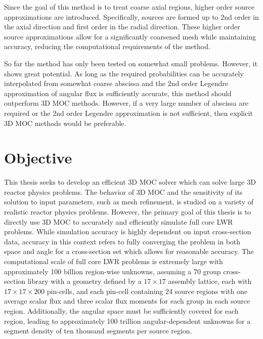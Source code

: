 Since the goal of this method is to treat coarse axial regions, higher order source approximations are introduced. Specifically, sources are formed up to 2nd order in the axial direction and first order in the radial direction. These higher order source approximations allow for a significantly coarsened mesh while maintaining accuracy, reducing the computational requirements of the method.

So far the method has only been tested on somewhat small problems. However, it shows great potential. As long as the required probabilities can be accurately interpolated from somewhat coarse abscissa and the 2nd order Legendre approximation of angular flux is sufficiently accurate, this method should outperform 3D \ac{MOC} methods. However, if a very large number of abscissa are required or the 2nd order Legendre approximation is not sufficient, then explicit 3D \ac{MOC} methods would be preferable. 


\section{Objective}

This thesis seeks to develop an efficient 3D \ac{MOC} solver which can solve large 3D reactor physics problems. The behavior of 3D \ac{MOC} and the sensitivity of its solution to input parameters, such as mesh refinement, is studied on a variety of realistic reactor physics problems. However, the primary goal of this thesis is to directly use 3D \ac{MOC} to accurately and efficiently simulate full core \ac{LWR} problems. While simulation accuracy is highly dependent on input cross-section data, accuracy in this context refers to fully converging the problem in both space and angle for a cross-section set which allows for reasonable accuracy. The computational scale of full core \ac{LWR} problems is extremely large with approximately 100 billion region-wise unknowns, assuming a 70 group cross-section library with a geometry defined by a $17 \times 17$ assembly lattice, each with $17 \times 17 \times 200$ pin-cells, and each pin-cell containing 24 source regions with one average scalar flux and three scalar flux moments for each group in each source region. Additionally, the angular space must be sufficiently covered for each region, leading to approximately 100 trillion angular-dependent unknowns for a segment density of ten thousand segments per source region.

